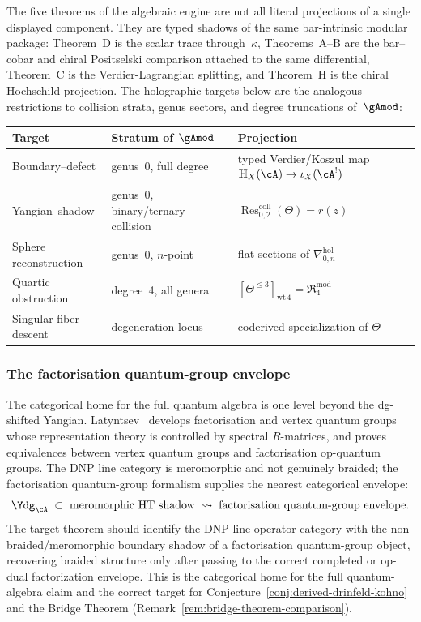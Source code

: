 \begin{remark}
\label{rem:five-targets-as-projections}
The five theorems of the algebraic engine are not all literal
projections of a single displayed component. They are typed shadows of
the same bar-intrinsic modular package: Theorem~D is the scalar trace
through~$\kappa$, Theorems~A--B are the bar--cobar and chiral
Positselski comparison attached to the same differential, Theorem~C is
the Verdier-Lagrangian splitting, and Theorem~H is the chiral
Hochschild projection. The holographic targets below are the analogous
restrictions to collision strata, genus sectors, and degree
truncations of~$\gAmod$:
\begin{center}
\begin{tabular}{lll}
\textbf{Target} & \textbf{Stratum of $\gAmod$} & \textbf{Projection}\\
\hline
Boundary--defect & genus~0, full degree
 & typed Verdier/Koszul map $\mathbb H_X(\cA)\to\iota_X(\cA^!)$\\
Yangian--shadow & genus~0, binary/ternary collision & $\operatorname{Res}^{\mathrm{coll}}_{0,2}(\Theta)=r(z)$\\
Sphere reconstruction & genus~0, $n$-point & flat sections of $\nabla^{\mathrm{hol}}_{0,n}$\\
Quartic obstruction & degree~4, all genera & $[\Theta^{\le 3}]_{\mathrm{wt}\,4} = \mathfrak{R}^{\mathrm{mod}}_4$\\
Singular-fiber descent & degeneration locus & coderived specialization of $\Theta$\\
\end{tabular}
\end{center}
\end{remark}

\subsubsection{The factorisation quantum-group envelope}

The categorical home for the full quantum algebra is one level beyond
the dg-shifted Yangian. Latyntsev~\cite{Latyntsev23} develops
factorisation and vertex quantum groups whose representation theory is
controlled by spectral $R$-matrices, and proves equivalences between
vertex quantum groups and factorisation op-quantum groups. The DNP
line category is meromorphic and not genuinely braided; the factorisation
quantum-group formalism supplies the nearest categorical envelope:
\begin{equation}\label{eq:fqg-envelope}
\Ydg_\cA
\;\subset\;
\text{meromorphic HT shadow}
\;\rightsquigarrow\;
\text{factorisation quantum-group envelope}.
\end{equation}
The target theorem should identify the DNP line-operator category
with the non-braided/meromorphic boundary shadow of a factorisation
quantum-group object, recovering braided structure only after
passing to the correct completed or op-dual factorization envelope.
This is the categorical home for the full quantum-algebra claim and
the correct target for
Conjecture~\ref{conj:derived-drinfeld-kohno} and the Bridge
Theorem (Remark~\ref{rem:bridge-theorem-comparison}).

